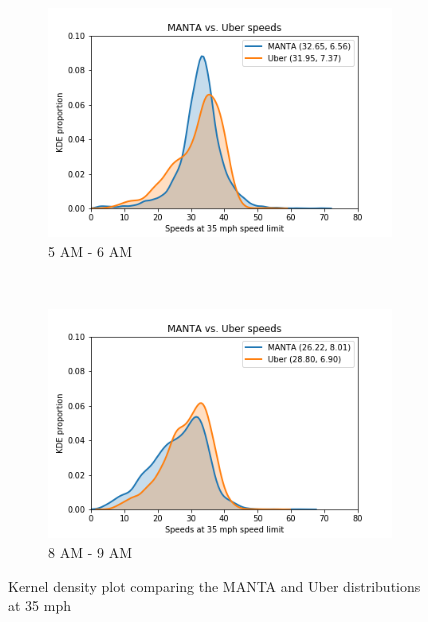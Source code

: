 \documentclass[final]{IEEEtran}
\begin{document}
\begin{figure}
    \centering
    \begin{subfigure}{\linewidth}
        \includegraphics[width=\linewidth]{figs/green_lights_5to6/kde_plot_speed_35.png}
        \caption{5 AM - 6 AM}
        \label{fig:kde_5to6_35}
    \end{subfigure}\\
    \begin{subfigure}{\linewidth}
    \includegraphics[width=\linewidth]{figs/green_lights_8to9/kde_plot_speed_35.png}
    \caption{8 AM - 9 AM}
    \label{fig:kde_8to9_35}
    \end{subfigure}
    \caption{Kernel density plot comparing the MANTA and Uber distributions at 35 mph}
\end{figure}

\end{document}
